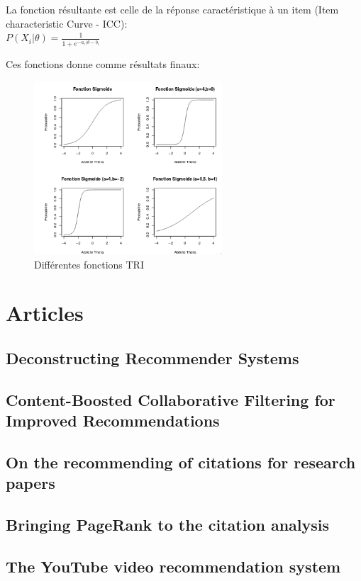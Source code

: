 \documentclass[oneside]{book}
\begin{document}
La fonction résultante est celle de la réponse caractéristique à un item (Item characteristic Curve - ICC):\\

\centering
$P(X_i|\theta) = \frac{1}{1 + e^{-a_i(\theta - b_i}}$
\justify

Ces fonctions donne comme résultats finaux:\\

\begin{figure}[!ht]
\centering
\includegraphics[width = 7cm]{tri.png}
\caption{Différentes fonctions TRI}
\label{fig:tri}
\end{figure}

\iffalse
\chapter{Articles}

\section{Deconstructing Recommender Systems}

\section{Content-Boosted Collaborative Filtering for Improved Recommendations}

\section{On the recommending of citations for research papers}

\section{Bringing PageRank to the citation analysis}

\section{The YouTube video recommendation system}
\end{document}
